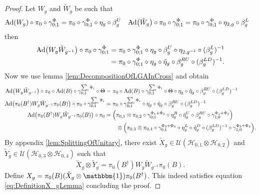 \documentclass[12pt,a4paper,twoside]{article}
\newcommand{\stkout}[1]{\ifmmode\text{\sout{\ensuremath{#1}}}\else\sout{#1}\fi}
\let\originalleft\left
\let\originalright\right
\renewcommand{\left}{\mathopen{}\mathclose\bgroup\originalleft}
\renewcommand{\right}{\aftergroup\egroup\originalright}
\newcommand{\UU}{\mathcal U}
\newcommand{\HH}{\mathcal H}
\newcommand{\id}{\mathbbm{1}}
\newcommand{\Ad}[1]{\textrm{Ad}\left(#1\right)}
\theoremstyle{definition}
\numberwithin{equation}{section}
\begin{document}
\begin{proof}
	Let $W_g$ and $\tilde W_g$ be such that
	\begin{align}
		\Ad{W_g}\circ\pi_0\circ\gamma^\Phi_{0;1}& =\pi_0\circ\gamma^\Phi_{0;1}\circ\eta_g\circ\beta_g^U
		&\Ad{\tilde W_g} \circ\pi_0\circ\gamma^\Phi_{0;1}& =\pi_0\circ\gamma^\Phi_{0;1}\circ\eta_{2,g}\circ\beta_g^L
	\end{align}
	then
	\begin{align}
		\Ad{W_g\tilde{W}_{g^{-1}}}\circ\pi_0\circ\gamma^\Phi_{0;1}&=\pi_0\circ\gamma^\Phi_{0;1}\circ\eta_g\circ\beta_g^U\circ\eta_{2,g^{-1}}\circ(\beta_g^L)^{-1}\\
		&=\pi_0\circ\gamma^\Phi_{0;1}\circ\eta_g\circ\tilde{\eta}_g\circ\beta_g^{RU}\circ(\beta_g^{LD})^{-1}.
	\end{align}
	Now we use lemma \ref{lem:DecompositionOfLGAInCross} and obtain
	\begin{align}
		\Ad{W_g\tilde{W}_{g^{-1}}}\circ\pi_0\circ\Ad{B}\circ\gamma^{\sum_i\Phi_i}_{0;1}\circ\stkout{\Theta}&=\pi_0\circ\Ad{B}\circ\gamma^{\sum_i\Phi_i}_{0;1}\circ\stkout{\Theta}\circ\eta_g\circ\tilde{\eta}_g\circ\beta_g^{RU}\circ(\beta_g^{LD})^{-1}\\
		\Ad{\pi_0(B^\dagger)W_g\tilde{W}_{g^{-1}}\pi_0(B)}\circ\pi_0\circ\gamma^{\sum_i\Phi_i}_{0;1}&=\pi_0\circ\gamma^{\sum_i\Phi_i}_{0;1}\circ\eta_g\circ\tilde{\eta}_g\circ\beta_g^{RU}\circ(\beta_g^{LD})^{-1}\\
		\Ad{\pi_0(B^\dagger)W_g\tilde{W}_{g^{-1}}\pi_0(B)}\circ\pi_0&=\left(\pi_{0,1}\otimes\pi_{0,2}\circ\gamma^{\Phi_1+\Phi_2}_{0;1}\circ\eta_g^R\circ\tilde{\eta}_g^U\circ\beta_g^{RU}\circ\gamma^{\Phi_1+\Phi_2}_{1;0}\right)\\
		\nonumber
		&\qquad\otimes \left(\pi_{0,3}\otimes\pi_{0,4}\circ\gamma^{\Phi_3+\Phi_4}_{0;1}\circ\eta_g^L\circ\tilde{\eta}_g^D\circ(\beta_g^{LD})^{-1}\circ\gamma^{\Phi_3+\Phi_4}_{1;0}\right).
	\end{align}
	By appendix \ref{lem:SplittingOfUnitary}, there exist $\tilde{X}_g\in\UU(\HH_{0,1}\otimes\HH_{0,2})$ and $\tilde{Y}_g\in\UU(\HH_{0,3}\otimes\HH_{0,4})$ such that
	\begin{equation}
		\tilde{X}_g\otimes\tilde{Y}_g=\pi_0(B^\dagger)W_g\tilde{W}_{g^{-1}}\pi_0(B).
	\end{equation}
	Define $X_g=\pi_0(B)(\tilde{X}_g\otimes\id)\pi_0(B^\dagger)$. This indeed satisfies equation \eqref{eq:DefinitionX_gLemma} concluding the proof.
\end{proof}
\end{document}
